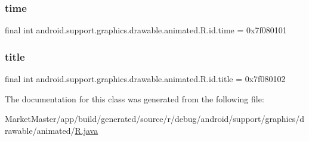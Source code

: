 \subsubsection{\texorpdfstring{time}{time}}
{\footnotesize\ttfamily final int android.\+support.\+graphics.\+drawable.\+animated.\+R.\+id.\+time = 0x7f080101\hspace{0.3cm}{\ttfamily [static]}}

\mbox{\label{classandroid_1_1support_1_1graphics_1_1drawable_1_1animated_1_1R_1_1id_a47a3e5ab1364d8adba942674f7c407ad}} 
\subsubsection{\texorpdfstring{title}{title}}
{\footnotesize\ttfamily final int android.\+support.\+graphics.\+drawable.\+animated.\+R.\+id.\+title = 0x7f080102\hspace{0.3cm}{\ttfamily [static]}}



The documentation for this class was generated from the following file\+:\begin{DoxyCompactItemize}
\item 
Market\+Master/app/build/generated/source/r/debug/android/support/graphics/drawable/animated/\mbox{\hyperlink{debug_2android_2support_2graphics_2drawable_2animated_2R_8java}{R.\+java}}\end{DoxyCompactItemize}
